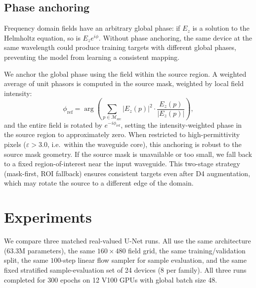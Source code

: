 \documentclass[%
 reprint,
 amsmath,amssymb,
 aps,
floatfix,
]{revtex4-2}
\begin{document}
\subsection{Phase anchoring}
Frequency domain fields have an arbitrary global phase: if $E_z$ is a solution to the Helmholtz equation, so is $E_ze^{i\phi}$. Without phase anchoring, the same device at the same wavelength could produce training targets with different global phases, preventing the model from learning a consistent mapping.

We anchor the global phase using the field within the source region. A weighted average of unit phasors is computed in the source mask, weighted by local field intensity:
\begin{equation}
    \phi_\text{ref} = \arg\!\left(\sum_{p \in \mathcal{M}_\text{src}} |E_z(p)|^2 \cdot
    \frac{E_z(p)}{|E_z(p)|}\right),
    \label{eq:phase_anchor}
\end{equation}
and the entire field is rotated by $e^{-i\phi_\text{ref}}$, setting the intensity-weighted phase in the source region to approximately zero. When restricted to high-permittivity pixels ($\varepsilon > 3.0$, i.e.\ within the waveguide core), this anchoring is robust to the source mask geometry. If the source mask is unavailable or too small, we fall back to a fixed region-of-interest near the input waveguide. This two-stage strategy (mask-first, ROI fallback) ensures consistent targets even after D4 augmentation, which may rotate the source to a different edge of the domain.



\section{\label{sec:level6}Experiments}

We compare three matched real-valued U-Net runs. All use the same architecture (63.3M parameters), the same $160\times480$ field grid, the same training/validation split, the same $100$-step linear flow sampler for sample evaluation, and the same fixed stratified sample-evaluation set of 24 devices (8 per family). All three runs completed for 300 epochs on 12 V100 GPUs with global batch size 48.
\end{document}
